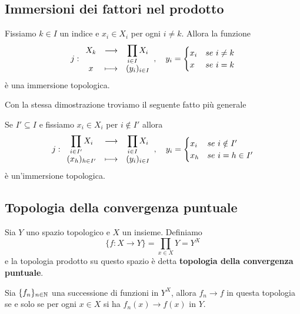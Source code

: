 \begin{multicols*}{2}
\subsection{Immersioni dei fattori nel prodotto}
\begin{proposition}\label{ImmersioniFattoriInProdottiSonoImmersioneTopologica}
Fissiamo $k\in I$ un indice e $x_i\in X_i$ per ogni $i\neq k$. Allora la funzione
\[j:\begin{array}{ccc} {X_k} & \longrightarrow & {\displaystyle \prod_{i\in I}X_i}\\ {x} & \longmapsto & {(y_i)_{i\in I}} \end{array},\quad y_i=
\begin{cases}
x_i & se\ i\neq k\\
x & se\ i=k
\end{cases}\]
è una immersione topologica.
\end{proposition}

Con la stessa dimostrazione troviamo il seguente fatto più generale
\begin{proposition}
Se $I'\subseteq I$ e fissiamo $x_i\in X_i$ per $i\notin I'$ allora
\[j:\begin{array}{ccc} {\displaystyle \prod_{i\in I'}X_i} & \longrightarrow & {\displaystyle \prod_{i\in I}X_i}\\ {(x_h)_{h\in I'}} & \longmapsto & {(y_i)_{i\in I}} \end{array},\quad y_i=\begin{cases}
x_i &se\ i\notin I'\\
x_h & se\ i=h\in I'
\end{cases}\]
è un'immersione topologica.
\end{proposition}

\subsection{Topologia della convergenza puntuale}
\begin{definition}
Sia $Y$ uno spazio topologico e $X$ un insieme. Definiamo
\[\{f:X\to Y\}=\prod_{x\in X}Y=Y^X\]
e la topologia prodotto su questo spazio è detta \textbf{topologia della convergenza puntuale}.
\end{definition}
\begin{proposition}
Sia $\{f_n\}_{n\in\mathbb{N}}$ una successione di funzioni in $Y^X$, allora $f_n\to f$ in questa topologia se e solo se per ogni $x\in X$ si ha $f_n(x)\to f(x)$ in $Y$.
\end{proposition}


\end{multicols*}
